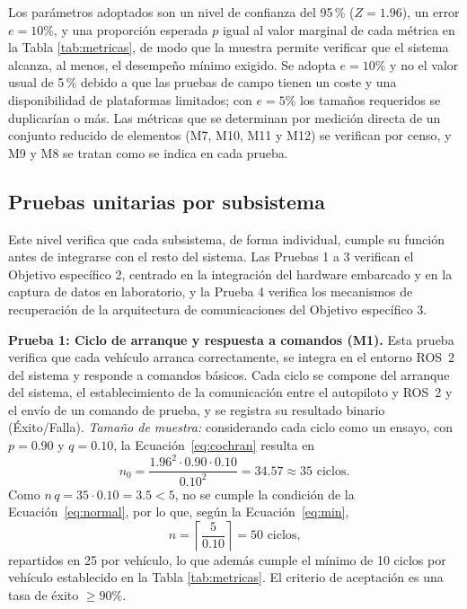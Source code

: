 Los parámetros adoptados son un nivel de confianza del 95\,\% ($Z = 1.96$), un error
 $e = 10\%$, y una proporción esperada $p$ igual al valor marginal de cada métrica
en la Tabla \ref{tab:metricas}, de modo que la muestra permite verificar que el sistema alcanza, al menos,
el desempeño mínimo exigido. Se adopta $e = 10\%$ y no el valor usual de 5\,\% debido a
que las pruebas de campo tienen un coste y una disponibilidad de plataformas limitados; con
$e = 5\%$ los tamaños requeridos se duplicarían o más. Las métricas que se determinan por
medición directa de un conjunto reducido de elementos (M7, M10, M11 y M12) se verifican por
censo, y M9 y M8 se tratan como se indica en cada prueba.


\subsection{Pruebas unitarias por subsistema}
\label{subsec:pruebas_unitarias}

Este nivel verifica que cada subsistema, de forma individual, cumple su función antes de
integrarse con el resto del sistema. Las Pruebas 1 a 3 verifican el Objetivo específico 2, centrado en la 
integración del hardware embarcado y en la captura de datos en laboratorio, y la Prueba 4 verifica los mecanismos 
de recuperación de la arquitectura de comunicaciones del Objetivo específico 3.

\textbf{Prueba 1: Ciclo de arranque y respuesta a comandos (M1).} Esta prueba verifica que cada vehículo 
arranca correctamente, se integra en el entorno ROS~2 del sistema y responde a comandos básicos. Cada ciclo 
se compone del arranque del sistema, el establecimiento de la comunicación entre el autopiloto y ROS~2 y el 
envío de un comando de prueba, y se registra su resultado binario (Éxito/Falla). \emph{Tamaño de muestra:} 
considerando cada ciclo como un
ensayo, con $p = 0.90$ y $q = 0.10$, la Ecuación~\eqref{eq:cochran} resulta en
\begin{equation*}
  n_0 = \frac{1.96^2 \cdot 0.90 \cdot 0.10}{0.10^2} = 34.57 \approx 35 \text{ ciclos.}
\end{equation*}
Como $n\,q = 35 \cdot 0.10 = 3.5 < 5$, no se cumple la condición de la
Ecuación~\eqref{eq:normal}, por lo que, según la Ecuación~\eqref{eq:min},
\begin{equation*}
  n = \left\lceil \frac{5}{0.10} \right\rceil = 50 \text{ ciclos,}
\end{equation*}
repartidos en 25 por vehículo, lo que además cumple el mínimo de 10 ciclos por vehículo
establecido en la Tabla \ref{tab:metricas}. El criterio de aceptación es una tasa de éxito $\geq 90\%$.

